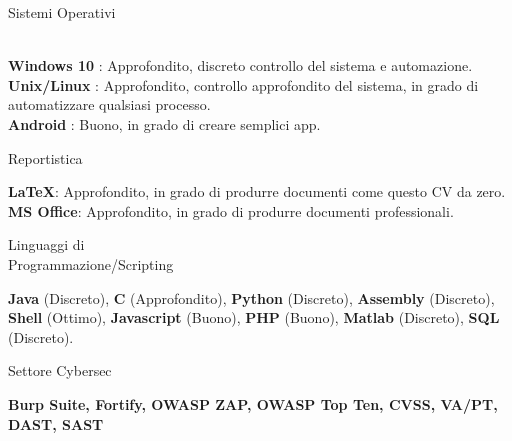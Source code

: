 \begin{minipage}{.3\textwidth}
	\flushright Sistemi Operativi \\ \faWindows \ \faLinux \ \faApple \ \faAndroid
\end{minipage}
\hfill
\begin{minipage}{.65\textwidth}
	\vfill
	\textbf{Windows 10} \faWindows : Approfondito, discreto controllo del sistema e automazione. 
	\\
	\textbf{Unix/Linux} \faLinux : Approfondito, controllo approfondito del sistema, in grado di automatizzare qualsiasi processo.
	\\
	\textbf{Android} \faAndroid : Buono, in grado di creare semplici app.
	\vfill
\end{minipage}

\bigskip

\begin{minipage}{.3\textwidth}
	\flushright Reportistica \faBook 
\end{minipage}
\hfill
\begin{minipage}{.65\textwidth}
	\vfill
	\textbf{\LaTeX}: Approfondito, in grado di produrre documenti come questo CV da zero. 
	\\
	\textbf{MS Office}: Approfondito, in grado di produrre documenti professionali.
	\vfill
\end{minipage}

\bigskip

\begin{minipage}{.3\textwidth}
	\flushright Linguaggi di \\ Programmazione/Scripting
\end{minipage}
\hfill
\begin{minipage}{.65\textwidth}
	\vfill
	\textbf{Java} (Discreto), \textbf{C} (Approfondito), \textbf{Python} (Discreto), \textbf{Assembly} (Discreto), \textbf{Shell} (Ottimo), \textbf{Javascript} (Buono), \textbf{PHP} (Buono), \textbf{Matlab} (Discreto), \textbf{SQL} (Discreto). 
	\vfill
\end{minipage}

\bigskip

\begin{minipage}{.3\textwidth}
	\flushright Settore Cybersec
\end{minipage}
\hfill
\begin{minipage}{.64\textwidth}
	\vfill
	\textbf{Burp Suite, Fortify, OWASP ZAP, OWASP Top Ten, CVSS, VA/PT, DAST, SAST} 
	\vfill
\end{minipage}